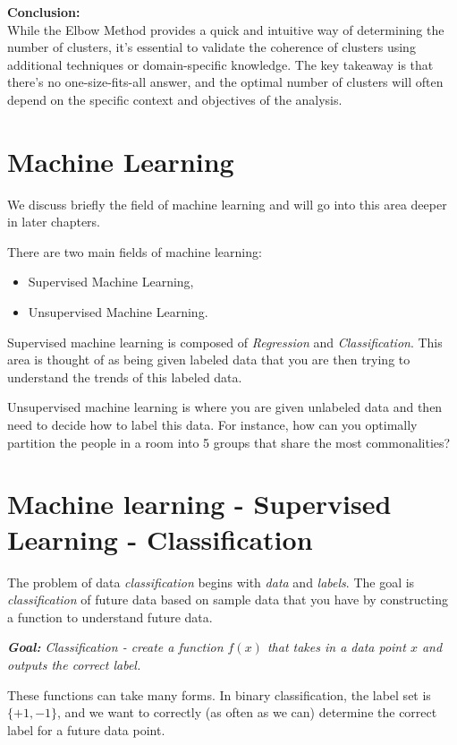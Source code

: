 \textbf{Conclusion:}\\
While the Elbow Method provides a quick and intuitive way of determining the number of clusters, it's essential to validate the coherence of clusters using additional techniques or domain-specific knowledge. The key takeaway is that there's no one-size-fits-all answer, and the optimal number of clusters will often depend on the specific context and objectives of the analysis.





\section{Machine Learning}
We discuss briefly the field of machine learning and will go into this area deeper in later chapters.

There are two main fields of machine learning:
\begin{itemize}
\item Supervised Machine Learning,
\item Unsupervised Machine Learning.
\end{itemize}
Supervised machine learning is composed of \emph{Regression} and \emph{Classification}.  This area is thought of as being given labeled data that you are then trying to understand the trends of this labeled data.

Unsupervised machine learning is where you are given unlabeled data and then need to decide how to label this data. For instance, how can you optimally partition the people in a room into 5 groups that share the most commonalities?



\section{Machine learning - Supervised Learning - Classification}
The problem of data \emph{classification} begins with \emph{data} and \emph{labels}.  The goal is \emph{classification} of future data based on sample data that you have by constructing a function to understand future data.
\begin{center}
\textit{
\textbf{Goal:} Classification - create a function $f(x)$ that takes in a data point $x$ and outputs the correct label.}
\end{center}

These functions can take many forms.  In binary classification, the label set is $\{+1, -1\}$, and we want to correctly (as often as we can) determine the correct label for a future data point.

